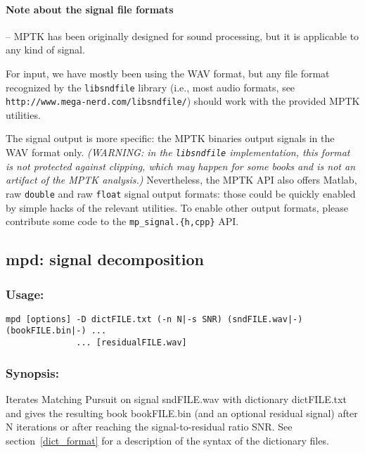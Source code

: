 \documentclass[11pt,a4paper]{article}
\begin{document}
\paragraph{Note about the signal file formats} -- MPTK has been originally designed for sound
processing, but it is applicable to any kind of signal.

For input, we have mostly been using the WAV format, but any file format
recognized by the \verb+libsndfile+ library (i.e., most audio formats, see
\verb+http://www.mega-nerd.com/libsndfile/+) should work with the provided MPTK
utilities.

The signal output is more specific: the MPTK binaries output signals in the WAV
format only. {\em (WARNING: in the \verb+libsndfile+ implementation, this
  format is not protected against clipping, which may happen for some books and
  is not an artifact of the MPTK analysis.)} Nevertheless, the MPTK API also
offers Matlab, raw \verb+double+ and raw \verb+float+ signal output formats:
those could be quickly enabled by simple hacks of the relevant utilities. To
enable other output formats, please contribute some code to the
\verb+mp_signal.{h,cpp}+ API.


\clearpage
\subsection{mpd: signal decomposition}

\subsubsection*{Usage:}
\begin{verbatim}
mpd [options] -D dictFILE.txt (-n N|-s SNR) (sndFILE.wav|-) (bookFILE.bin|-) ...
              ... [residualFILE.wav]
\end{verbatim}

\subsubsection*{Synopsis:}
Iterates Matching Pursuit on signal sndFILE.wav with dictionary dictFILE.txt
and gives the resulting book bookFILE.bin (and an optional residual signal)
after N iterations or after reaching the signal-to-residual ratio SNR.  See
section~\ref{dict_format} for a description of the syntax of the dictionary
files.
\end{document}
